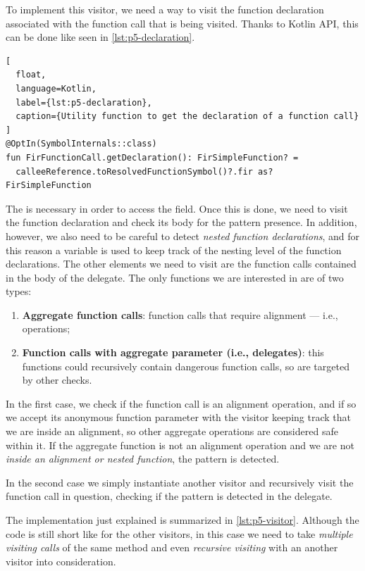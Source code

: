 \documentclass[12pt,a4paper,openright,twoside]{book}
\begin{document}
To implement this visitor, we need a way to visit the function declaration
associated with the function call that is being visited. Thanks to Kotlin API,
this can be done like seen in \cref{lst:p5-declaration}.
%
\begin{lstlisting}[
  float, 
  language=Kotlin,
  label={lst:p5-declaration},
  caption={Utility function to get the declaration of a function call}
]
@OptIn(SymbolInternals::class)
fun FirFunctionCall.getDeclaration(): FirSimpleFunction? =
  calleeReference.toResolvedFunctionSymbol()?.fir as? FirSimpleFunction
\end{lstlisting}
%
The  is necessary in order to access the 
field. Once this is done, we need to visit the function declaration and check
its body for the pattern presence. In addition, however, we also need to be
careful to detect \emph{nested function declarations}, and for this reason 
a  variable is used to keep track of the nesting
level of the function declarations. 
%
The other elements we need to visit are the function calls contained in the body
of the delegate. The only functions we are interested in are of two types:

\begin{enumerate}
  \item \textbf{Aggregate function calls}: function calls that require alignment
  --- i.e.,  operations;
  \item \textbf{Function calls with aggregate parameter (i.e., delegates)}: this 
  functions could recursively contain dangerous function calls, so are targeted 
  by other checks.
\end{enumerate}

In the first case, we check if the function call is an alignment operation, and if
so we accept its anonymous function parameter with the visitor keeping track that 
we are inside an alignment, so other aggregate operations are considered safe
within it. If the aggregate function is not an alignment operation and we are not
\emph{inside an alignment or nested function}, the pattern is detected.

In the second case we simply instantiate another visitor and recursively visit the
function call in question, checking if the pattern is detected in the delegate.

The implementation just explained is summarized in \cref{lst:p5-visitor}.
Although the code is still short like for the other visitors, in this case we
need to take \emph{multiple visiting calls} of the same method and even
\emph{recursive visiting} with an another visitor into consideration.
\end{document}
